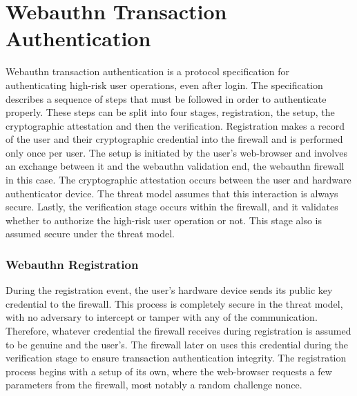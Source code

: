 \chapter{Webauthn Transaction Authentication}

Webauthn transaction authentication is a protocol specification for authenticating high-risk user operations, even after login. The specification describes a sequence of steps that must be followed in order to authenticate properly. These steps can be split into four stages, registration, the setup, the cryptographic attestation and then the verification. Registration makes a record of the user and their cryptographic credential into the firewall and is performed only once per user. The setup is initiated by the user's web-browser and involves an exchange between it and the webauthn validation end, the webauthn firewall in this case. The cryptographic attestation occurs between the user and hardware authenticator device. The threat model assumes that this interaction is always secure. Lastly, the verification stage occurs within the firewall, and it validates whether to authorize the high-risk user operation or not. This stage also is assumed secure under the threat model.

\subsection{Webauthn Registration}

During the registration event, the user's hardware device sends its public key credential to the firewall. This process is completely secure in the threat model, with no adversary to intercept or tamper with any of the communication. Therefore, whatever credential the firewall receives during registration is assumed to be genuine and the user's. The firewall later on uses this credential during the verification stage to ensure transaction authentication integrity. The registration process begins with a setup of its own, where the web-browser requests a few parameters from the firewall, most notably a random challenge nonce.


